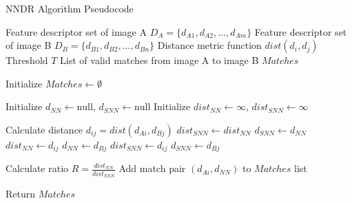 \begin{algorithm}[H]
    \caption{NNDR Algorithm Pseudocode}
    \begin{algorithmic}[1]
    \Require Feature descriptor set of image A \(D_A = \{d_{A1}, d_{A2}, ..., d_{Am}\}\)
    \Require Feature descriptor set of image B \(D_B = \{d_{B1}, d_{B2}, ..., d_{Bn}\}\)
    \Require Distance metric function \(dist(d_i, d_j)\)
    \Require Threshold \(T\)
    \Ensure List of valid matches from image A to image B \(Matches\)
    
    \State Initialize \(Matches \leftarrow \emptyset\)
    
        \State Initialize \(d_{NN} \leftarrow \text{null}\), \(d_{SNN} \leftarrow \text{null}\)
        \State Initialize \(dist_{NN} \leftarrow \infty\), \(dist_{SNN} \leftarrow \infty\)
    
            \State Calculate distance \(d_{ij} = dist(d_{Ai}, d_{Bj})\)
                \State \(dist_{SNN} \leftarrow dist_{NN}\)
                \State \(d_{SNN} \leftarrow d_{NN}\)
                \State \(dist_{NN} \leftarrow d_{ij}\)
                \State \(d_{NN} \leftarrow d_{Bj}\)
             
                \State \(dist_{SNN} \leftarrow d_{ij}\)
                \State \(d_{SNN} \leftarrow d_{Bj}\)
            \EndIf
        \EndFor
    
         
            \State Calculate ratio \(R = \frac{dist_{NN}}{dist_{SNN}}\)
                \State Add match pair \((d_{Ai}, d_{NN})\) to \(Matches\) list
            \EndIf
        \EndIf
    \EndFor
    
    \State Return \(Matches\)
    
    \end{algorithmic}
\end{algorithm}